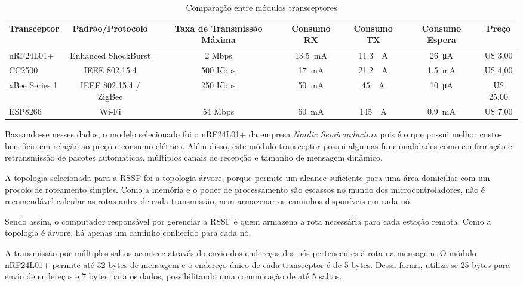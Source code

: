 \documentclass[a4,11pt]{report}
\begin{document}
\begin{table}[h]
	\caption{\small Comparação entre módulos transceptores}
	\resizebox{\textwidth}{!} {
		\begin{tabular}{|l|c|c|c|c|c|c|}
		\hline
		Transceptor   & Padrão/Protocolo       & Taxa de Transmissão Máxima & Consumo RX & Consumo TX &
		Consumo Espera & Preço     \\ \hline
		nRF24L01+     & Enhanced ShockBurst    & 2 Mbps   & \SI{13.5}{\milli \ampere} & \SI{11.3}{\milli
		\ampere} & \SI{26}{\micro \ampere} & U\$ 3,00  \\ \hline
		CC2500        & IEEE 802.15.4          & 500 Kbps & \SI{17}{\milli \ampere}   & \SI{21.2} {\milli
		\ampere}  & \SI{1.5}{\milli \ampere} & U\$ 4,00  \\ \hline
		xBee Series 1 & IEEE 802.15.4 / ZigBee & 250 Kbps & \SI{50}{\milli \ampere}   & \SI{45}{\milli
		\ampere} & \SI{10}{\micro \ampere}  & U\$ 25,00 \\ \hline
		ESP8266       & Wi-Fi                  & 54 Mbps  & \SI{60}{\milli \ampere}   & \SI{145}{\milli
		\ampere} & \SI{0.9}{\milli \ampere}& U\$ 7,00  \\ \hline
		\end{tabular}
	}
	\label{quadro:transceivers}
\end{table}

Baseando-se nesses dados, o modelo selecionado foi o nRF24L01+ da empresa \textit{Nordic Semiconductors} pois
é o que possui melhor custo-benefício em relação ao preço e consumo elétrico. Além disso, este módulo
transceptor possui algumas funcionalidades como confirmação e retransmissão de pacotes automáticos, múltiplos
canais de recepção e tamanho de mensagem dinâmico.

A topologia selecionada para a RSSF foi a topologia árvore, porque permite um alcance suficiente para uma área
domiciliar com um procolo de roteamento simples. Como a memória e o poder de processamento são escassos no mundo
dos microcontroladores, não é recomendável calcular as rotas antes de cada transmissão, nem armazenar os
caminhos disponíveis em cada nó.

Sendo assim, o computador responsável por gerenciar a RSSF é quem armazena a rota necessária para cada estação
remota. Como a topologia é árvore, há apenas um caminho conhecido para cada nó.

A transmissão por múltiplos saltos acontece através do envio dos endereços dos nós pertencentes à rota na
mensagem. O módulo nRF24L01+ permite até 32 bytes de mensagem e o endereço único de cada transceptor é de 5
bytes. Dessa forma, utiliza-se 25 bytes para envio de endereços e 7 bytes para os dados, possibilitando uma
comunicação de até 5 saltos.
\end{document}
